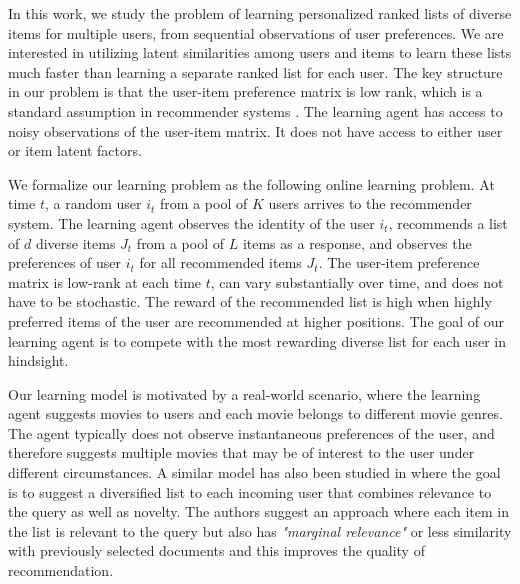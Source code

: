 
In this work, we study the problem of learning personalized ranked lists of diverse items for multiple users, from sequential observations of user preferences. We are interested in utilizing latent similarities among users and items to learn these lists much faster than learning a separate ranked list for each user. The key structure in our problem is that the user-item preference matrix is low rank, which is a standard assumption in recommender systems \citep{koren2009matrix,ricci2011liorrokach}. The learning agent has access to noisy observations of the user-item matrix. It does not have access to either user or item latent factors.

We formalize our learning problem as the following online learning problem. At time $t$, a random user $i_t$ from a pool of $K$ users arrives to the recommender system. The learning agent observes the identity of the user $i_t$, recommends a list of $d$ diverse items $J_t$ from a pool of $L$ items as a response, and observes the preferences of user $i_t$ for all recommended items $J_t$. The user-item preference matrix is low-rank at each time $t$, can vary substantially over time, and does not have to be stochastic. The reward of the recommended list is high when highly preferred items of the user are recommended at higher positions. The goal of our learning agent is to compete with the most rewarding diverse list for each user in hindsight.

Our learning model is motivated by a real-world scenario, where the learning agent suggests movies to users and each movie belongs to different movie genres. The agent typically does not observe instantaneous preferences of the user, and therefore suggests multiple movies that may be of interest to the user under different circumstances. A similar model has also been studied in \citet{carbonell1998use} where the goal is to suggest a diversified list to each incoming user that combines relevance to the query as well as novelty. The authors suggest an approach where each item in the list is relevant to the query but also has \textit{"marginal relevance"} or less similarity with previously selected documents and this improves the quality of recommendation.




